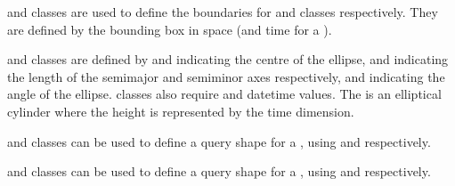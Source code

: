 \documentclass[letterpaper,10pt,english]{sphinxmanual}
\begin{document}
\sphinxAtStartPar
{} and  classes are used to define the boundaries for  and 
classes respectively. They are defined by the bounding box in space (and time for a ).

\sphinxAtStartPar
{} and  classes are defined by  and  indicating the centre of the ellipse, 
and  indicating the length of the semi\sphinxhyphen{}major and semi\sphinxhyphen{}minor axes respectively, and  indicating the angle
of the ellipse.  classes also require  and  datetime values. The
 is an elliptical cylinder where the height is represented by the time dimension.

\sphinxAtStartPar
{} and  classes can be used to define a query shape for a , using 
and  respectively.

\sphinxAtStartPar
{} and  classes can be used to define a query shape for a , using
 and  respectively.
\end{document}
